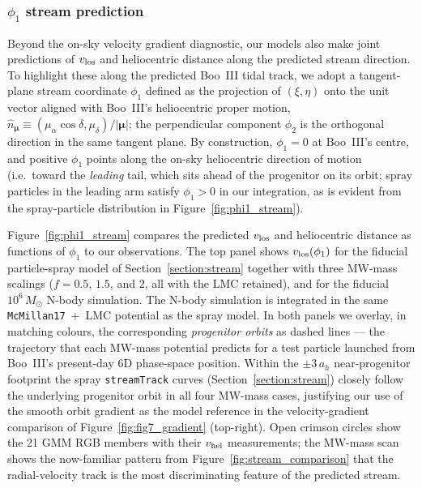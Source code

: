 \documentclass[twocolumn]{aastex631}
\begin{document}
\subsubsection{$\phi_1$ stream prediction}
Beyond the on-sky velocity gradient diagnostic, our models also make joint predictions of $v_{\rm los}$ and heliocentric distance along the predicted stream direction. To highlight these along the predicted Boo~III tidal track, we adopt a tangent-plane stream coordinate $\phi_1$ defined as the projection of $(\xi, \eta)$ onto the unit vector aligned with Boo~III's heliocentric proper motion, $\hat{n}_{\boldsymbol\mu} \equiv (\mu_\alpha\cos\delta, \mu_\delta) / |\boldsymbol\mu|$; the perpendicular component $\phi_2$ is the orthogonal direction in the same tangent plane. By construction, $\phi_1 = 0$ at Boo~III's centre, and positive $\phi_1$ points along the on-sky heliocentric direction of motion (i.e.\ toward the \emph{leading} tail, which sits ahead of the progenitor on its orbit; spray particles in the leading arm satisfy $\phi_1 > 0$ in our integration, as is evident from the spray-particle distribution in Figure~\ref{fig:phi1_stream}).

Figure~\ref{fig:phi1_stream} compares the predicted $v_{\rm los}$ and heliocentric distance as functions of $\phi_1$ to our observations. The top panel shows $v_{\rm los}(\phi_1)$ for the fiducial particle-spray model of Section~\ref{section:stream} \citep[\texttt{galpy}'s \texttt{fardal15spraydf} implementation of the][Lagrange-point spray algorithm]{Fardal2015} together with three MW-mass scalings ($f=0.5$, $1.5$, and $2$, all with the LMC retained), and for the fiducial $10^6\,M_\odot$ N-body simulation. The N-body simulation is integrated in the same \texttt{McMillan17}~+~LMC potential as the spray model. In both panels we overlay, in matching colours, the corresponding \emph{progenitor orbits} as dashed lines --- the trajectory that each MW-mass potential predicts for a test particle launched from Boo~III's present-day 6D phase-space position. Within the $\pm 3\,a_h$ near-progenitor footprint the spray \texttt{streamTrack} curves (Section~\ref{section:stream}) closely follow the underlying progenitor orbit in all four MW-mass cases, justifying our use of the smooth orbit gradient as the model reference in the velocity-gradient comparison of Figure~\ref{fig:fig7_gradient} (top-right). Open crimson circles show the 21 GMM RGB members with their $v_{\rm hel}$ measurements; the MW-mass scan shows the now-familiar pattern from Figure~\ref{fig:stream_comparison} that the radial-velocity track is the most discriminating feature of the predicted stream.
\end{document}
